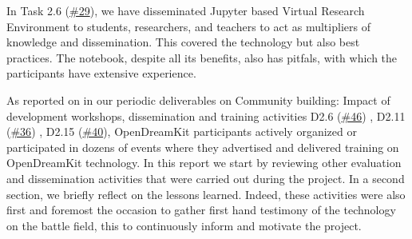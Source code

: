 In Task 2.6
(\href{https://github.com/OpenDreamKit/OpenDreamKit/issues/29}{\#29}),
we have disseminated Jupyter based Virtual Research Environment to
students, researchers, and teachers to act as multipliers of knowledge
and dissemination. This covered the technology but also best practices.
The notebook, despite all its benefits, also has pitfals, with which the
participants have extensive experience.

As reported on in our periodic deliverables on Community building:
Impact of development workshops, dissemination and training activities
D2.6
(\href{https://github.com/OpenDreamKit/OpenDreamKit/issues/46}{\#46}) ,
D2.11
(\href{https://github.com/OpenDreamKit/OpenDreamKit/issues/36}{\#36}) ,
D2.15
(\href{https://github.com/OpenDreamKit/OpenDreamKit/issues/40}{\#40}),
OpenDreamKit participants actively organized or participated in dozens
of events where they advertised and delivered training on OpenDreamKit
technology. In this report we start by reviewing other evaluation and
dissemination activities that were carried out during the project. In a
second section, we briefly reflect on the lessons learned. Indeed, these
activities were also first and foremost the occasion to gather first
hand testimony of the technology on the battle field, this to
continuously inform and motivate the project.
